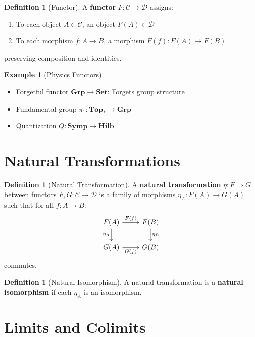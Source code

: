 \documentclass[11pt,a4paper,openright]{book}
\theoremstyle{plain}
\theoremstyle{definition}
\newtheorem{definition}[theorem]{Definition}
\newtheorem{example}[theorem]{Example}
\newcommand{\Hilb}{\mathbf{Hilb}}
\newcommand{\Set}{\mathbf{Set}}
\begin{document}
\begin{definition}[Functor]
A \textbf{functor} $F: \mathcal{C} \to \mathcal{D}$ assigns:
\begin{enumerate}[label=(\roman*)]
    \item To each object $A \in \mathcal{C}$, an object $F(A) \in \mathcal{D}$
    \item To each morphism $f: A \to B$, a morphism $F(f): F(A) \to F(B)$
\end{enumerate}
preserving composition and identities.
\end{definition}

\begin{example}[Physics Functors]
\begin{itemize}
    \item Forgetful functor $\mathbf{Grp} \to \Set$: Forgets group structure
    \item Fundamental group $\pi_1: \mathbf{Top}_* \to \mathbf{Grp}$
    \item Quantization $Q: \mathbf{Symp} \to \Hilb$
\end{itemize}
\end{example}

\section{Natural Transformations}

\begin{definition}[Natural Transformation]
A \textbf{natural transformation} $\eta: F \Rightarrow G$ between functors $F, G: \mathcal{C} \to \mathcal{D}$ is a family of morphisms $\eta_A: F(A) \to G(A)$ such that for all $f: A \to B$:
\begin{equation}
\begin{tikzcd}
F(A) \ar[r, "F(f)"] \ar[d, "\eta_A"'] & F(B) \ar[d, "\eta_B"] \\
G(A) \ar[r, "G(f)"'] & G(B)
\end{tikzcd}
\end{equation}
commutes.
\end{definition}

\begin{definition}[Natural Isomorphism]
A natural transformation is a \textbf{natural isomorphism} if each $\eta_A$ is an isomorphism.
\end{definition}

\section{Limits and Colimits}
\end{document}

